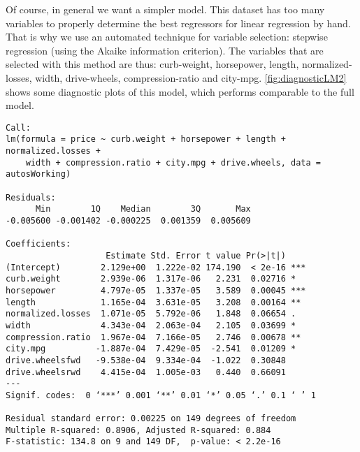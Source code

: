 Of course, in general we want a simpler model. This dataset has too many variables to properly determine the best regressors for linear regression by hand. That is why we use an automated technique for variable selection: stepwise regression (using the Akaike information criterion).
% 
The variables that are selected with this method are thus: curb-weight, horsepower, length, normalized-losses, width, drive-wheels, compression-ratio and city-mpg. \autoref{fig:diagnosticLM2} shows some diagnostic plots of this model, which performs comparable to the full model.

\begin{verbatim}
Call:
lm(formula = price ~ curb.weight + horsepower + length + normalized.losses + 
    width + compression.ratio + city.mpg + drive.wheels, data = autosWorking)

Residuals:
      Min        1Q    Median        3Q       Max 
-0.005600 -0.001402 -0.000225  0.001359  0.005609 

Coefficients:
                    Estimate Std. Error t value Pr(>|t|)    
(Intercept)        2.129e+00  1.222e-02 174.190  < 2e-16 ***
curb.weight        2.939e-06  1.317e-06   2.231  0.02716 *  
horsepower         4.797e-05  1.337e-05   3.589  0.00045 ***
length             1.165e-04  3.631e-05   3.208  0.00164 ** 
normalized.losses  1.071e-05  5.792e-06   1.848  0.06654 .  
width              4.343e-04  2.063e-04   2.105  0.03699 *  
compression.ratio  1.967e-04  7.166e-05   2.746  0.00678 ** 
city.mpg          -1.887e-04  7.429e-05  -2.541  0.01209 *  
drive.wheelsfwd   -9.538e-04  9.334e-04  -1.022  0.30848    
drive.wheelsrwd    4.415e-04  1.005e-03   0.440  0.66091    
---
Signif. codes:  0 ‘***’ 0.001 ‘**’ 0.01 ‘*’ 0.05 ‘.’ 0.1 ‘ ’ 1 

Residual standard error: 0.00225 on 149 degrees of freedom
Multiple R-squared: 0.8906,	Adjusted R-squared: 0.884 
F-statistic: 134.8 on 9 and 149 DF,  p-value: < 2.2e-16 
\end{verbatim}

